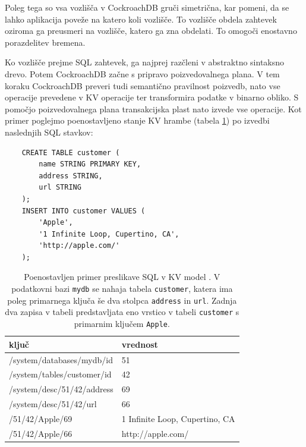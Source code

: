 \documentclass[a4paper, 12pt]{book}
\begin{document}
Poleg tega so vsa vozlišča v CockroachDB gruči simetrična, kar pomeni, da se lahko aplikacija poveže na katero koli vozlišče. To vozlišče obdela zahtevek oziroma ga preusmeri na vozlišče, katero ga zna obdelati. To omogoči enostavno porazdelitev bremena.

Ko vozlišče prejme SQL zahtevek, ga najprej razčleni v abstraktno sintaksno drevo. Potem CockroachDB začne s pripravo poizvedovalnega plana. V tem koraku CockroachDB preveri tudi semantično pravilnost poizvedb, nato vse operacije prevedene v KV operacije ter transformira podatke v binarno obliko. S pomočjo poizvedovalnega plana transakcijska plast nato izvede vse operacije. Kot primer poglejmo poenostavljeno stanje KV hrambe (tabela \ref{tbl_crdb_sql_kv_mapping}) po izvedbi naslednjih SQL stavkov:

\begin{listing}[H]
\begin{verbatim}
    CREATE TABLE customer (
        name STRING PRIMARY KEY,
        address STRING,
        url STRING
    );
    INSERT INTO customer VALUES (
        'Apple',
        '1 Infinite Loop, Cupertino, CA',
        'http://apple.com/'
    );
\end{verbatim}
\label{sql-example-sql-mapping}
\end{listing}

\begin{table}[H]
\begin{center}
\begin{tabular}{ l|l } 
\textbf{ključ} & \textbf{vrednost} \\
\hline
/system/databases/mydb/id & 51 \\
/system/tables/customer/id & 42 \\ 
/system/desc/51/42/address & 69 \\ 
/system/desc/51/42/url & 66 \\
/51/42/Apple/69 & 1 Infinite Loop, Cupertino, CA \\
/51/42/Apple/66 & http://apple.com/ \\
\end{tabular}
\end{center}
\caption{Poenostavljen primer preslikave SQL v KV model \cite{CRDB-design}. V podatkovni bazi \texttt{mydb} se nahaja tabela \texttt{customer}, katera ima poleg primarnega ključa še dva stolpca \texttt{address} in \texttt{url}. Zadnja dva zapisa v tabeli predstavljata eno vrstico v tabeli \texttt{customer} s primarnim ključem \texttt{Apple}.}
\label{tbl_crdb_sql_kv_mapping}
\end{table}
\end{document}
